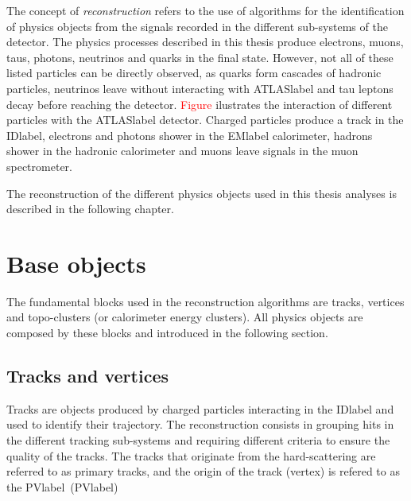 The concept of \textit{reconstruction} refers to the use of algorithms for the identification of physics objects from the signals recorded in the different sub-systems of the detector. The physics processes described in this thesis produce electrons, muons, taus, photons, neutrinos and quarks in the final state. However, not all of these listed particles can be directly observed, as quarks form cascades of hadronic particles, neutrinos leave without interacting with \acrshort{ATLASlabel} and tau leptons decay before reaching the detector. \textcolor{red}{Figure} ilustrates the interaction of different particles with the \acrshort{ATLASlabel} detector. Charged particles produce a track in the \acrshort{IDlabel}, electrons and photons shower in the \acrshort{EMlabel} calorimeter, hadrons shower in the hadronic calorimeter and muons leave signals in the muon spectrometer.

The reconstruction of the different physics objects used in this thesis analyses is described in the following chapter.

\section{Base objects}

The fundamental blocks used in the reconstruction algorithms are tracks, vertices and topo-clusters (or calorimeter energy clusters). All physics objects are composed by these blocks and introduced in the following section.

\subsection{Tracks and vertices}

Tracks are objects produced by charged particles interacting in the \acrshort{IDlabel} and used to identify their trajectory. The reconstruction consists in grouping hits in the different tracking sub-systems and requiring different criteria to ensure the quality of the tracks. The tracks that originate from the hard-scattering are referred to as primary tracks, and the origin of the track (vertex) is refered to as the  \acrfull{PVlabel}~(\acrshort{PVlabel})

